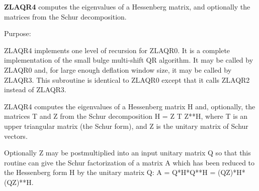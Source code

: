 {\bfseries Z\+L\+A\+Q\+R4} computes the eigenvalues of a Hessenberg matrix, and optionally the matrices from the Schur decomposition. 

 \begin{DoxyParagraph}{Purpose\+: }
\begin{DoxyVerb}    ZLAQR4 implements one level of recursion for ZLAQR0.
    It is a complete implementation of the small bulge multi-shift
    QR algorithm.  It may be called by ZLAQR0 and, for large enough
    deflation window size, it may be called by ZLAQR3.  This
    subroutine is identical to ZLAQR0 except that it calls ZLAQR2
    instead of ZLAQR3.

    ZLAQR4 computes the eigenvalues of a Hessenberg matrix H
    and, optionally, the matrices T and Z from the Schur decomposition
    H = Z T Z**H, where T is an upper triangular matrix (the
    Schur form), and Z is the unitary matrix of Schur vectors.

    Optionally Z may be postmultiplied into an input unitary
    matrix Q so that this routine can give the Schur factorization
    of a matrix A which has been reduced to the Hessenberg form H
    by the unitary matrix Q:  A = Q*H*Q**H = (QZ)*H*(QZ)**H.\end{DoxyVerb}
 
\end{DoxyParagraph}

